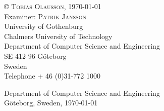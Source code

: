 \begin{titlepage}
\noindent \copyright \textsc{ Tobias Olausson}, \monthdate\today \\

\noindent Examiner: \textsc{Patrik Jansson} \\

\noindent University of Gothenburg \\
Chalmers University of Technology \\
Department of Computer Science and Engineering \\
SE-412 96 Göteborg \\
Sweden \\
Telephone + 46 (0)31-772 1000 \\

\vfill

\noindent Department of Computer Science and Engineering \\
Göteborg, Sweden, \monthdate\today
\end{titlepage}

